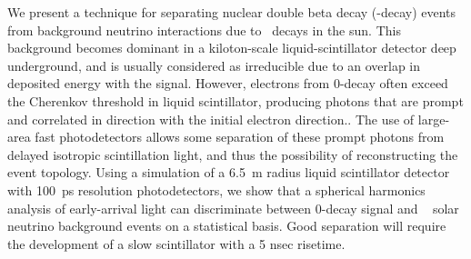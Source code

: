 We present a technique for separating nuclear double beta decay
(\bb-decay) events from background neutrino interactions due to
\B~decays in the sun.  This background becomes dominant in a
kiloton-scale liquid-scintillator detector deep underground, and is
usually considered as irreducible due to an overlap in deposited
energy with the signal.  However, electrons from 0\nbb-decay often
exceed the Cherenkov threshold in liquid scintillator, producing
photons that are prompt and correlated in direction with the
initial electron direction.. The use of large-area fast photodetectors
allows some separation of these prompt photons from delayed isotropic
scintillation light, and thus the possibility of reconstructing the
event topology.  Using a simulation of a 6.5~m radius liquid
scintillator detector with 100~ps resolution photodetectors, we show
that a spherical harmonics analysis of early-arrival light can
discriminate between 0\nbb-decay signal and
\B~ solar neutrino background events on a statistical basis. 
Good separation will require the development of a slow scintillator 
with a 5 nsec risetime.



